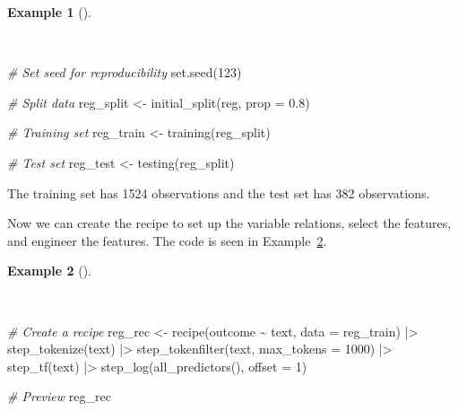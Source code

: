 \documentclass[
  letterpaper,
  DIV=11,
  numbers=noendperiod]{scrreprt}
\newenvironment{Shaded}{\begin{snugshade}}{\end{snugshade}}
\newcommand{\AttributeTok}[1]{\textcolor[rgb]{0.00,0.00,0.00}{#1}}
\newcommand{\CommentTok}[1]{\textcolor[rgb]{0.00,0.00,0.00}{\textit{#1}}}
\newcommand{\DecValTok}[1]{\textcolor[rgb]{0.00,0.00,0.00}{#1}}
\newcommand{\FloatTok}[1]{\textcolor[rgb]{0.00,0.00,0.00}{#1}}
\newcommand{\FunctionTok}[1]{\textcolor[rgb]{0.00,0.00,0.00}{#1}}
\newcommand{\NormalTok}[1]{\textcolor[rgb]{0.00,0.00,0.00}{#1}}
\newcommand{\OtherTok}[1]{\textcolor[rgb]{0.00,0.00,0.00}{#1}}
\newcommand{\SpecialCharTok}[1]{\textcolor[rgb]{0.00,0.00,0.00}{#1}}
\theoremstyle{definition}
\newtheorem{example}{Example}[chapter]
\theoremstyle{remark}
\begin{document}
\begin{example}[]\protect\hypertarget{exm-pda-reg-initial-split}{}\label{exm-pda-reg-initial-split}

~

\begin{Shaded}
\begin{Highlighting}[]
\CommentTok{\# Set seed for reproducibility}
\FunctionTok{set.seed}\NormalTok{(}\DecValTok{123}\NormalTok{)}

\CommentTok{\# Split data}
\NormalTok{reg\_split }\OtherTok{\textless{}{-}}
  \FunctionTok{initial\_split}\NormalTok{(reg, }\AttributeTok{prop =} \FloatTok{0.8}\NormalTok{)}

\CommentTok{\# Training set}
\NormalTok{reg\_train }\OtherTok{\textless{}{-}}
  \FunctionTok{training}\NormalTok{(reg\_split)}

\CommentTok{\# Test set}
\NormalTok{reg\_test }\OtherTok{\textless{}{-}}
  \FunctionTok{testing}\NormalTok{(reg\_split)}
\end{Highlighting}
\end{Shaded}

\end{example}

The training set has 1524 observations and the test set has 382
observations.

Now we can create the recipe to set up the variable relations, select
the features, and engineer the features. The code is seen in
Example~\ref{exm-pda-reg-recipe}.

\begin{example}[]\protect\hypertarget{exm-pda-reg-recipe}{}\label{exm-pda-reg-recipe}

~

\begin{Shaded}
\begin{Highlighting}[]
\CommentTok{\# Create a recipe}
\NormalTok{reg\_rec }\OtherTok{\textless{}{-}}
  \FunctionTok{recipe}\NormalTok{(outcome }\SpecialCharTok{\textasciitilde{}}\NormalTok{ text, }\AttributeTok{data =}\NormalTok{ reg\_train) }\SpecialCharTok{|\textgreater{}}
  \FunctionTok{step\_tokenize}\NormalTok{(text) }\SpecialCharTok{|\textgreater{}}
  \FunctionTok{step\_tokenfilter}\NormalTok{(text, }\AttributeTok{max\_tokens =} \DecValTok{1000}\NormalTok{) }\SpecialCharTok{|\textgreater{}}
  \FunctionTok{step\_tf}\NormalTok{(text) }\SpecialCharTok{|\textgreater{}}
  \FunctionTok{step\_log}\NormalTok{(}\FunctionTok{all\_predictors}\NormalTok{(), }\AttributeTok{offset =} \DecValTok{1}\NormalTok{)}

\CommentTok{\# Preview}
\NormalTok{reg\_rec}
\end{Highlighting}
\end{Shaded}

\end{example}
\end{document}
